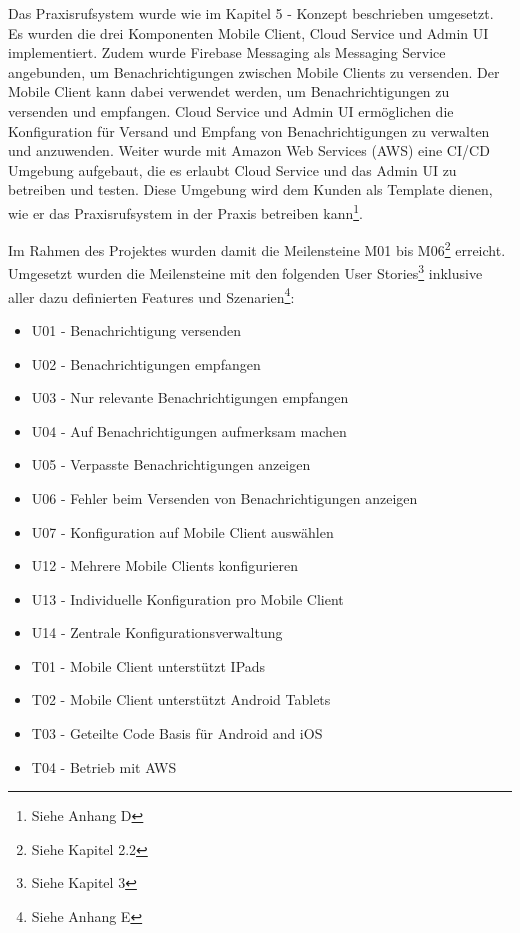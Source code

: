 Das Praxisrufsystem wurde wie im Kapitel 5 - Konzept beschrieben umgesetzt.
Es wurden die drei Komponenten Mobile Client, Cloud Service und Admin UI implementiert.
Zudem wurde Firebase Messaging als Messaging Service angebunden, um Benachrichtigungen zwischen Mobile Clients zu versenden.
Der Mobile Client kann dabei verwendet werden, um Benachrichtigungen zu versenden und empfangen.
Cloud Service und Admin UI ermöglichen die Konfiguration für Versand und Empfang von Benachrichtigungen zu verwalten und anzuwenden.
Weiter wurde mit Amazon Web Services (AWS) eine CI/CD Umgebung aufgebaut, die es erlaubt Cloud Service und das Admin UI zu betreiben und testen.
Diese Umgebung wird dem Kunden als Template dienen, wie er das Praxisrufsystem in der Praxis betreiben kann\footnote{Siehe Anhang D}.

Im Rahmen des Projektes wurden damit die Meilensteine M01 bis M06\footnote{Siehe Kapitel 2.2} erreicht.
Umgesetzt wurden die Meilensteine mit den folgenden User Stories\footnote{Siehe Kapitel 3} inklusive aller dazu definierten Features und Szenarien\footnote{Siehe Anhang E}:

\begin{itemize}
    \item U01 - Benachrichtigung versenden
    \item U02 - Benachrichtigungen empfangen
    \item U03 - Nur relevante Benachrichtigungen empfangen
    \item U04 - Auf Benachrichtigungen aufmerksam machen
    \item U05 - Verpasste Benachrichtigungen anzeigen
    \item U06 - Fehler beim Versenden von Benachrichtigungen anzeigen
    \item U07 - Konfiguration auf Mobile Client auswählen
    \item U12 - Mehrere Mobile Clients konfigurieren
    \item U13 - Individuelle Konfiguration pro Mobile Client
    \item U14 - Zentrale Konfigurationsverwaltung
    \item T01 - Mobile Client unterstützt IPads
    \item T02 - Mobile Client unterstützt Android Tablets
    \item T03 - Geteilte Code Basis für Android and iOS
    \item T04 - Betrieb mit AWS
\end{itemize}

